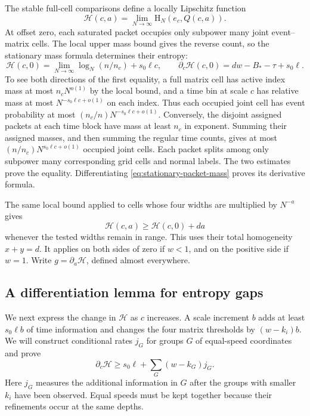 The stable full-cell comparisons define a locally Lipschitz function
\begin{equation}
 \mathscr H(c,a)=
       \lim_{N\to\infty}\mathrm H_N(e_c,Q(c,a)).
 \label{eq:entropy-function}
\end{equation}
At offset zero, each saturated packet occupies only subpower many joint
event--matrix cells.  The local upper mass bound gives the reverse count,
so the stationary mass formula determines their entropy:
\begin{equation}
 \mathscr H(c,0)=\lim_{N\to\infty}\log_N(n/n_c)+s_0\ell c,
 \qquad
 \partial_c\mathscr H(c,0)=dw-B_*-\tau+s_0\ell.
 \label{eq:entropy-central-value}
\end{equation}
To see both directions of the first equality, a full matrix cell has
active index mass at most $n_cN^{o(1)}$ by the local bound, and a time
bin at scale $c$ has relative mass at most
$N^{-s_0\ell c+o(1)}$ on each index.  Thus each occupied joint cell
has event probability at most
$(n_c/n)N^{-s_0\ell c+o(1)}$.  Conversely, the disjoint assigned
packets at each time block have mass at least $n_c$ in exponent.
Summing their assigned masses, and then summing the regular time counts,
gives at most $(n/n_c)N^{s_0\ell c+o(1)}$ occupied joint cells.
Each packet splits among only subpower many corresponding grid cells
and normal labels.  The two estimates prove the equality.  Differentiating
\eqref{eq:stationary-packet-mass} proves its derivative formula.

The same local bound applied to cells whose four widths are multiplied
by $N^{-a}$ gives
\begin{equation}
 \mathscr H(c,a)\ge\mathscr H(c,0)+da
 \label{eq:entropy-offset-bound}
\end{equation}
whenever the tested widths remain in range.  This uses their total
homogeneity $x+y=d$.  It applies on both sides of zero if $w<1$,
and on the positive side if $w=1$.  Write
$g=\partial_a\mathscr H$, defined almost everywhere.

\subsection{A differentiation lemma for entropy gaps}

We next express the change in $\mathscr H$ as $c$ increases.  A scale
increment $b$ adds at least $s_0\ell b$ of time information and changes
the four matrix thresholds by $(w-k_i)b$.  We will construct conditional
rates $j_G$ for groups $G$ of equal-speed coordinates and prove
\[
 \partial_c\mathscr H\ge s_0\ell+\sum_G(w-k_G)j_G.
\]
Here $j_G$ measures the additional information in $G$ after the groups
with smaller $k_i$ have been observed.  Equal speeds must be kept together
because their refinements occur at the same depths.

